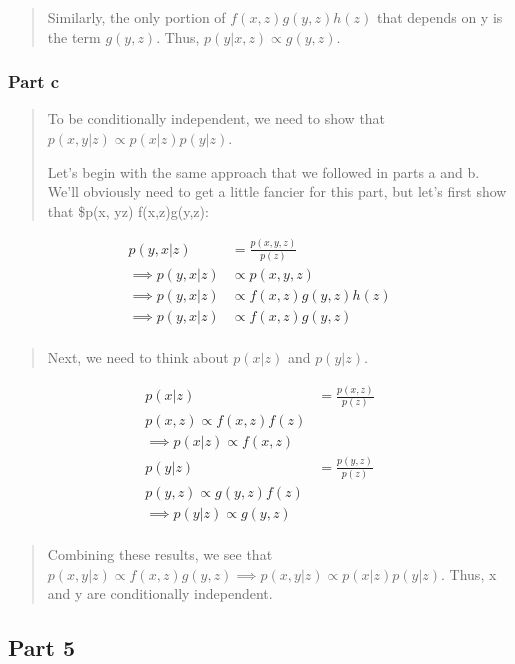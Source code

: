 \documentclass[
  letterpaper,
  DIV=11,
  numbers=noendperiod]{scrartcl}
\begin{document}
\begin{quote}
Similarly, the only portion of \(f(x, z)g(y, z)h(z)\) that depends on y
is the term \(g(y, z)\). Thus, \(p(y|x, z) \propto g(y, z)\).
\end{quote}

\subsubsection{Part c}\label{part-c-1}

\begin{quote}
To be conditionally independent, we need to show that
\(p(x, y|z) \propto p(x|z)p(y|z)\).

Let's begin with the same approach that we followed in parts a and b.
We'll obviously need to get a little fancier for this part, but let's
first show that \$p(x, y\textbar z) \propto f(x,z)g(y,z):
\end{quote}

\begin{align*}
p(y, x| z) &= \frac{p(x, y, z)}{p(z)}\\
\implies p(y,x| z) &\propto p(x, y, z)\\
\implies p(y,x| z) &\propto f(x, z)g(y, z)h(z)\\
\implies p(y,x| z) &\propto f(x, z)g(y, z)\\
\end{align*}

\begin{quote}
Next, we need to think about \(p(x|z)\) and \(p(y|z)\).
\end{quote}

\begin{align*}
p(x|z) &= \frac{p(x,z)}{p(z)}\\
p(x,z) \propto f(x,z)f(z)\\
\implies p(x|z)\propto f(x,z)\\
p(y|z) &= \frac{p(y,z)}{p(z)}\\
p(y,z) \propto g(y,z)f(z)\\
\implies p(y|z)\propto g(y,z)\\
\end{align*}

\begin{quote}
Combining these results, we see that
\(p(x, y | z)\propto f(x,z)g(y,z)\implies p(x, y |z) \propto p(x|z)p(y|z)\).
Thus, x and y are conditionally independent.
\end{quote}

\subsection{Part 5}\label{part-5}
\end{document}
